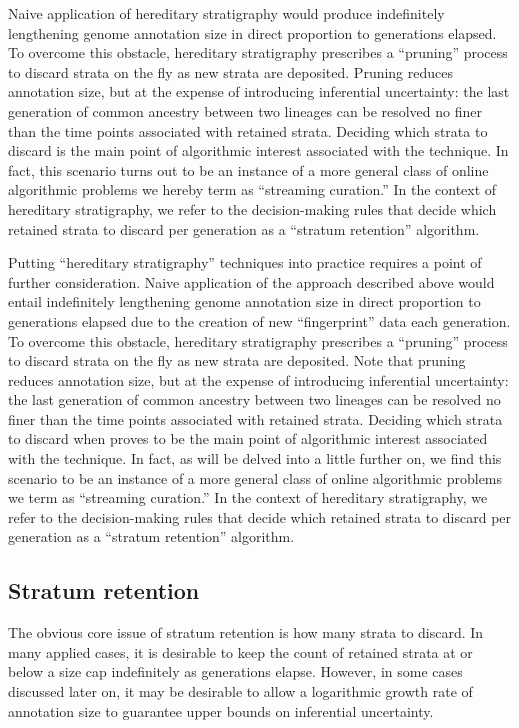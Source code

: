 Naive application of hereditary stratigraphy would produce indefinitely lengthening genome annotation size in direct proportion to generations elapsed.
To overcome this obstacle, hereditary stratigraphy prescribes a ``pruning'' process to discard strata on the fly as new strata are deposited.
Pruning reduces annotation size, but at the expense of introducing inferential uncertainty: the last generation of common ancestry between two lineages can be resolved no finer than the time points associated with retained strata.
Deciding which strata to discard is the main point of algorithmic interest associated with the technique.
In fact, this scenario turns out to be an instance of a more general class of online algorithmic problems we hereby term as ``streaming curation.''
In the context of hereditary stratigraphy, we refer to the decision-making rules that decide which retained strata to discard per generation as a ``stratum retention'' algorithm.

Putting ``hereditary stratigraphy'' techniques into practice requires a point of further consideration.
Naive application of the approach described above would entail indefinitely lengthening genome annotation size in direct proportion to generations elapsed due to the creation of new ``fingerprint'' data each generation.
To overcome this obstacle, hereditary stratigraphy prescribes a ``pruning'' process to discard strata on the fly as new strata are deposited.
Note that pruning reduces annotation size, but at the expense of introducing inferential uncertainty: the last generation of common ancestry between two lineages can be resolved no finer than the time points associated with retained strata.
Deciding which strata to discard when proves to be the main point of algorithmic interest associated with the technique.
In fact, as will be delved into a little further on, we find this scenario to be an instance of a more general class of online algorithmic problems we term as ``streaming curation.''
In the context of hereditary stratigraphy, we refer to the decision-making rules that decide which retained strata to discard per generation as a ``stratum retention'' algorithm.


\subsection{Stratum retention}

The obvious core issue of stratum retention is how many strata to discard.
In many applied cases, it is desirable to keep the count of retained strata at or below a size cap indefinitely as generations elapse.
However, in some cases discussed later on, it may be desirable to allow a logarithmic growth rate of annotation size to guarantee upper bounds on inferential uncertainty.

